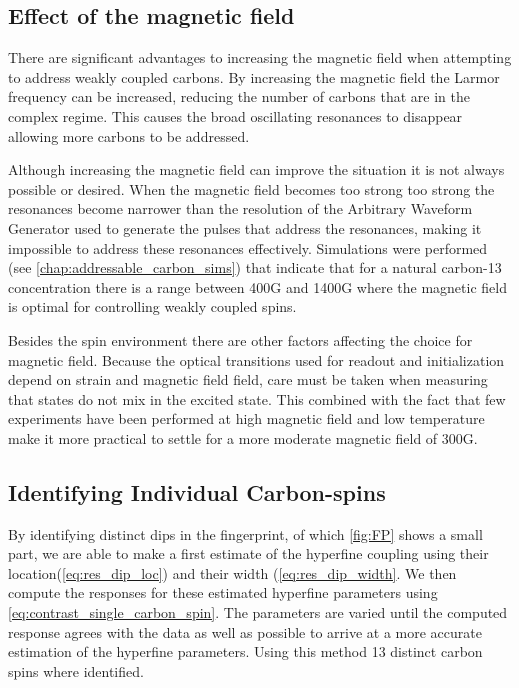 \subsection{Effect of the magnetic field}

There are significant advantages to increasing the magnetic field when attempting to address weakly coupled carbons.
By increasing the magnetic field the Larmor frequency can be increased, reducing the number of carbons that are in the complex regime.
This causes the broad oscillating resonances to disappear allowing more carbons to be addressed.

Although increasing the magnetic field can improve the situation it is not always possible or desired.
When the magnetic field becomes too strong too strong the resonances become narrower than the resolution of the Arbitrary Waveform Generator used to generate the pulses that address the resonances, making it impossible to address these resonances effectively.
Simulations were performed (see \cref{chap:addressable_carbon_sims}) that indicate that for a natural carbon-13 concentration there is a range between 400G and 1400G where the magnetic field is optimal for controlling weakly coupled spins.

Besides the spin environment there are other factors affecting the choice for magnetic field.
Because the optical transitions used for readout and initialization depend on strain and magnetic field field\citep{Hensen2011MeasurementBased}, care must be taken when measuring that states do not mix in the excited state.
This combined with the fact that few experiments have been performed at high magnetic field and low temperature make it more practical to settle for a more moderate magnetic field of 300G.

\subsection{Identifying Individual Carbon-spins}

By identifying distinct dips in the fingerprint, of which \cref{fig:FP} shows a small part, we are able to make a first estimate of the hyperfine coupling using their location(\cref{eq:res_dip_loc}) and their width (\cref{eq:res_dip_width}.
We then compute the responses for these estimated hyperfine parameters using \cref{eq:contrast_single_carbon_spin}.
The parameters are varied until the computed response agrees with the data as well as possible to arrive at a more accurate estimation of the hyperfine parameters.
Using this method 13 distinct carbon spins where identified.

